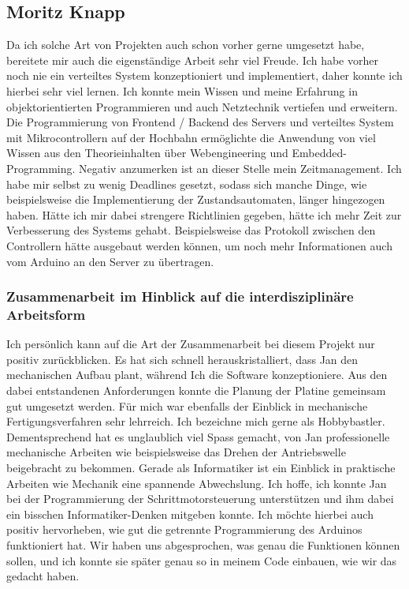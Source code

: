 \subsection{Moritz Knapp}
Da ich solche Art von Projekten auch schon vorher gerne umgesetzt habe, bereitete mir auch die eigenständige Arbeit sehr viel Freude. Ich habe vorher noch nie ein verteiltes System konzeptioniert und implementiert, daher konnte ich hierbei sehr viel lernen. Ich konnte mein Wissen und meine Erfahrung in objektorientierten Programmieren und auch Netztechnik vertiefen und erweitern. Die Programmierung von Frontend / Backend des Servers und verteiltes System mit Mikrocontrollern auf der Hochbahn ermöglichte die Anwendung von viel Wissen aus den Theorieinhalten über Webengineering und Embedded-Programming. Negativ anzumerken ist an dieser Stelle mein Zeitmanagement. Ich habe mir selbst zu wenig Deadlines gesetzt, sodass sich manche Dinge, wie beispielsweise die Implementierung der Zustandsautomaten, länger hingezogen haben. Hätte ich mir dabei strengere Richtlinien gegeben, hätte ich mehr Zeit zur Verbesserung des Systems gehabt. Beispielsweise das Protokoll zwischen den Controllern hätte ausgebaut werden können, um noch mehr Informationen auch vom Arduino an den Server zu übertragen. 
\subsubsection{Zusammenarbeit im Hinblick auf die interdisziplinäre Arbeitsform}
Ich persönlich kann auf die Art der Zusammenarbeit bei diesem Projekt nur positiv zurückblicken. Es hat sich schnell herauskristalliert, dass Jan den mechanischen Aufbau plant, während Ich die Software konzeptioniere. Aus den dabei entstandenen Anforderungen konnte die Planung der Platine gemeinsam gut umgesetzt werden. Für mich war ebenfalls der Einblick in mechanische Fertigungsverfahren sehr lehrreich. Ich bezeichne mich gerne als Hobbybastler. Dementsprechend hat es unglaublich viel Spass gemacht, von Jan professionelle mechanische Arbeiten wie beispielsweise das Drehen der Antriebswelle beigebracht zu bekommen. Gerade als Informatiker ist ein Einblick in praktische Arbeiten wie Mechanik eine spannende Abwechslung. Ich hoffe, ich konnte Jan bei der Programmierung der Schrittmotorsteuerung unterstützen und ihm dabei ein bisschen Informatiker-Denken mitgeben konnte. Ich möchte hierbei auch positiv hervorheben, wie gut die getrennte Programmierung des Arduinos funktioniert hat. Wir haben uns abgesprochen, was genau die Funktionen können sollen, und ich konnte sie später genau so in meinem Code einbauen, wie wir das gedacht haben. 


